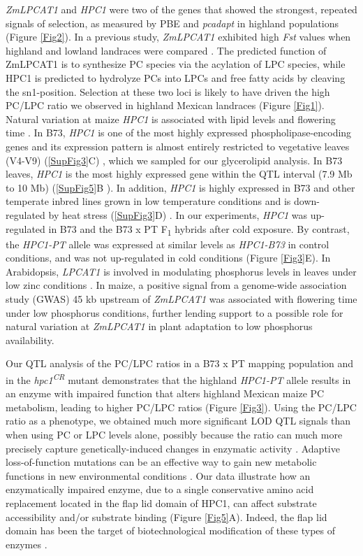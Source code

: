 \documentclass[9pt,twocolumn,twoside,lineno]{biorxiv}
\begin{document}
\textit{ZmLPCAT1} and \textit{HPC1} were two of the genes that showed the strongest, repeated signals of selection, as measured by PBE and \textit{pcadapt} in highland populations (Figure \ref{Fig2}). 
In a previous study, \textit{ZmLPCAT1} exhibited high \textit{Fst} values when highland and lowland landraces were compared \cite{Takuno2015-uj}.
The predicted function of ZmLPCAT1 is to synthesize PC species via the acylation of LPC species, while HPC1 is predicted to hydrolyze PCs into LPCs and free fatty acids by cleaving the sn1-position.
Selection at these two loci is likely to have driven the high PC/LPC ratio we observed in highland Mexican landraces (Figure \ref{Fig1}).
Natural variation at maize \textit{HPC1} is associated with lipid levels \cite{Riedelsheimer2012-bx} and flowering time \cite{Chen2012-gg, Hung2012-ms}. 
In B73, \textit{HPC1} is one of the most highly expressed phospholipase-encoding genes and its expression pattern is almost entirely restricted to vegetative leaves (V4-V9) (\ref{SupFig3}C) \cite{Stelpflug2016-vr}, which we sampled for our glycerolipid analysis. 
In B73 leaves, \textit{HPC1} is the most highly expressed gene within  the QTL interval (7.9 Mb to 10 Mb) (\ref{SupFig5}B \cite{Stelpflug2016-vr}).
In addition, \textit{HPC1} is highly expressed in B73 and other temperate inbred lines grown in low temperature conditions and is down-regulated by heat stress (\ref{SupFig3}D) \cite{Waters2017-nat}.
In our experiments, \textit{HPC1} was up-regulated in B73 and the B73 x PT F\textsubscript{1} hybrids after cold exposure. 
By contrast, the \textit{HPC1-PT} allele was expressed at similar levels as \textit{HPC1-B73} in control conditions, and was not up-regulated in cold conditions (Figure \ref{Fig3}E).
In Arabidopsis, \textit{LPCAT1} is involved in modulating phosphorus levels in leaves under low zinc conditions \cite{Kisko2018-zm}.
In maize, a positive signal from a genome-wide association study (GWAS) 45 kb upstream of \textit{ZmLPCAT1} was associated with flowering time under low phosphorus conditions, further lending support to a possible role for natural variation at \textit{ZmLPCAT1} in plant adaptation to low phosphorus availability. 

Our QTL analysis of the PC/LPC ratios in a B73 x PT mapping population and in the \textit{hpc1\textsuperscript{CR}} mutant demonstrates that the highland \textit{HPC1-PT} allele results in an enzyme with impaired function that alters highland Mexican maize PC metabolism, leading to higher PC/LPC ratios (Figure \ref{Fig3}). 
Using the PC/LPC ratio as a phenotype, we obtained much more significant LOD QTL signals than when using PC or LPC levels alone, possibly because the ratio can much more precisely capture genetically-induced changes in enzymatic activity \cite{Petersen2012-ii}.
Adaptive loss-of-function mutations can be an effective way to gain new metabolic functions in new environmental conditions \cite{Hottes2013-np}. 
Our data illustrate how an enzymatically impaired enzyme, due to a single conservative amino acid replacement located in the flap lid domain of HPC1,  can affect substrate  accessibility and/or substrate binding (Figure \ref{Fig5}A). 
Indeed, the flap lid domain has been the target of biotechnological modification of these types of enzymes \cite{Khan2017-ua}.
\end{document}
